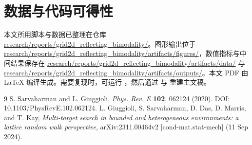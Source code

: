 \documentclass[11pt,fontset=fandol]{ctexart}
\begin{document}
\section{数据与代码可得性}
本文所用脚本与数据已整理在仓库 \url{research/reports/grid2d_reflecting_bimodality/}。图形输出位于 \url{research/reports/grid2d_reflecting_bimodality/artifacts/figures/}，数值指标与中间结果保存在 \url{research/reports/grid2d_reflecting_bimodality/artifacts/data/} 与 \url{research/reports/grid2d_reflecting_bimodality/artifacts/outputs/}。本文 PDF 由 \LaTeX{} 编译生成。需要复现时，可运行 ，然后通过  与  重建主文稿。

\begin{thebibliography}{9}
   S. Sarvaharman and L. Giuggioli, \emph{Phys. Rev. E} \textbf{102}, 062124 (2020). DOI: 10.1103/PhysRevE.102.062124.
   L. Giuggioli, S. Sarvaharman, D. Das, D. Marris, and T. Kay, \emph{Multi-target search in bounded and heterogeneous environments: a lattice random walk perspective}, arXiv:2311.00464v2 [cond-mat.stat-mech] (11 Sep 2024).
\end{thebibliography}
\end{document}
